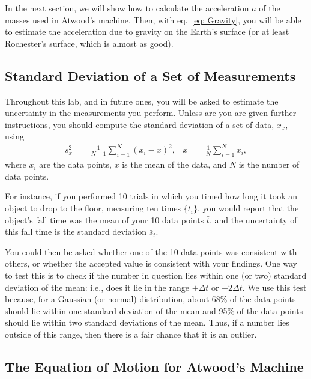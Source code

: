 \documentclass[addpoints]{physlabs}
\begin{document}
\begin{labsection}
\begin{theory}
In the next section, we will show how to calculate the acceleration $a$ of the masses used in Atwood’s machine. Then, with eq.~\ref{eq: Gravity}, you will be able to estimate the acceleration due to gravity on the Earth’s surface (or at least Rochester’s surface, which is almost as good).

\subsection*{Standard Deviation of a Set of Measurements}

Throughout this lab, and in future ones, you will be asked to estimate the uncertainty in the measurements you perform. Unless are you are given further instructions, you should compute the standard deviation of a set of data, $\bar{x}_x$, using
%
\begin{align}\label{eq: Standard Deviation}
    \bar{s}^2_x &= \frac{1}{N-1}\sum_{i=1}^{N} (x_i -\bar{x})^2,
    &
    \bar{x} &= \frac{1}{N}\sum_{i=1}^N x_i,
\end{align}
%
where $x_i$ are the data points, $\bar{x}$ is the mean of the data, and $N$ is the number of data points.

For instance, if you performed 10 trials in which you timed how long it took an object to drop to the floor, measuring ten times $\{t_i\}$, you would report that the object’s fall time was the mean of your 10 data points $\bar{t}$, and the uncertainty of this fall time is the standard deviation $\bar{s}_t$. 

You could then be asked whether one of the 10 data points was consistent with others, or whether the accepted value is consistent with your findings. One way to test this is to check if the number in question lies within one (or two) standard deviation of the mean: i.e., does it lie in the range $\pm\Delta t$ or $\pm2\Delta t$. We use this test because, for a Gaussian (or normal) distribution, about 68\% of the data points should lie within one standard deviation of the mean and 95\% of the data points should lie within two standard deviations of the mean. Thus, if a number lies outside of this range, then there is a fair chance that it is an outlier.

\subsection*{The Equation of Motion for Atwood's Machine}


\end{theory}
\end{labsection}
\end{document}
